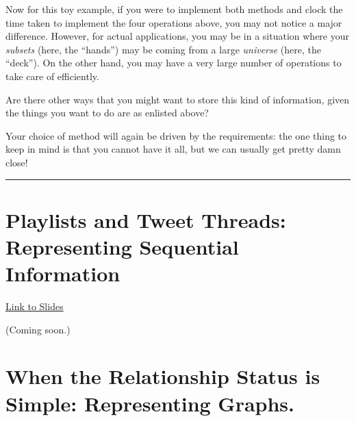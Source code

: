 \documentclass[
  letterpaper,
  DIV=11,
  numbers=noendperiod]{scrreprt}
\begin{document}
Now for this toy example, if you were to implement both methods and
clock the time taken to implement the four operations above, you may not
notice a major difference. However, for actual applications, you may be
in a situation where your \emph{subsets} (here, the ``hands'') may be
coming from a large \emph{universe} (here, the ``deck''). On the other
hand, you may have a very large number of operations to take care of
efficiently.

\begin{tcolorbox}[standard jigsaw,toptitle=1mm, titlerule=0mm, bottomtitle=1mm, title=\textcolor{quarto-callout-caution-color}{\faFire}\hspace{0.5em}{Food for thought.}, coltitle=black, colback=white, toprule=.15mm, colframe=quarto-callout-caution-color-frame, arc=.35mm, rightrule=.15mm, opacityback=0, left=2mm, leftrule=.75mm, colbacktitle=quarto-callout-caution-color!10!white, opacitybacktitle=0.6, bottomrule=.15mm]
Are there other ways that you might want to store this kind of
information, given the things you want to do are as enlisted above?
\end{tcolorbox}

Your choice of method will again be driven by the requirements: the one
thing to keep in mind is that you cannot have it all, but we can usually
get pretty damn close!

\begin{center}\rule{0.5\linewidth}{0.5pt}\end{center}

\hypertarget{hyvor-talk-view}{}

\hypertarget{playlists-and-tweet-threads-representing-sequential-information}{%
\chapter{\texorpdfstring{Playlists and Tweet Threads: Representing
Sequential
Information}{Playlists and Tweet Threads:  Representing Sequential Information}}\label{playlists-and-tweet-threads-representing-sequential-information}}

\href{hhttps://slides.com/neeldhara/dsa1-w01\#/2/1}{Link to Slides}

(Coming soon.)

\hypertarget{when-the-relationship-status-is-simple-representing-graphs.}{%
\chapter{\texorpdfstring{When the Relationship Status is Simple:
Representing
Graphs.}{When the Relationship Status is Simple:  Representing Graphs.}}\label{when-the-relationship-status-is-simple-representing-graphs.}}
\end{document}
